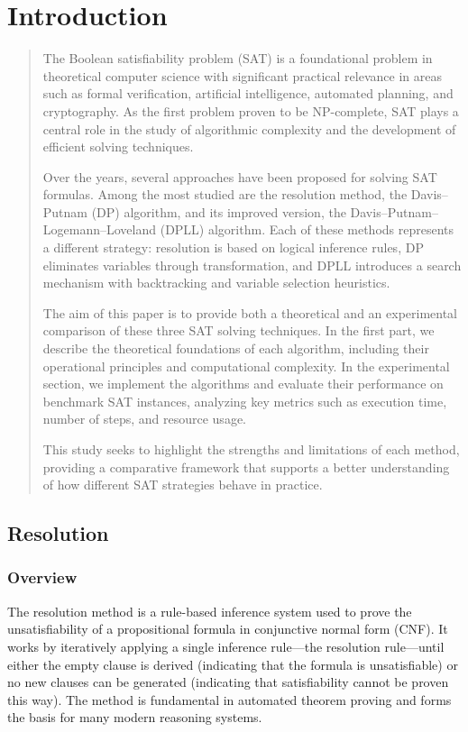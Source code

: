 \documentclass{article}
\begin{document}
\section{Introduction}
\begin{quote}
The Boolean satisfiability problem (SAT) is a foundational problem in theoretical computer science with significant practical relevance in areas such as formal verification, artificial intelligence, automated planning, and cryptography. As the first problem proven to be NP-complete, SAT plays a central role in the study of algorithmic complexity and the development of efficient solving techniques.

Over the years, several approaches have been proposed for solving SAT formulas. Among the most studied are the resolution method, the Davis–Putnam (DP) algorithm, and its improved version, the Davis–Putnam–Logemann–Loveland (DPLL) algorithm. Each of these methods represents a different strategy: resolution is based on logical inference rules, DP eliminates variables through transformation, and DPLL introduces a search mechanism with backtracking and variable selection heuristics.

The aim of this paper is to provide both a theoretical and an experimental comparison of these three SAT solving techniques. In the first part, we describe the theoretical foundations of each algorithm, including their operational principles and computational complexity. In the experimental section, we implement the algorithms and evaluate their performance on benchmark SAT instances, analyzing key metrics such as execution time, number of steps, and resource usage.

This study seeks to highlight the strengths and limitations of each method, providing a comparative framework that supports a better understanding of how different SAT strategies behave in practice.
\end{quote}

\subsection{Resolution}

\subsubsection{Overview}
The resolution method is a rule-based inference system used to prove the unsatisfiability of a propositional formula in conjunctive normal form (CNF). It works by iteratively applying a single inference rule—the resolution rule—until either the empty clause is derived (indicating that the formula is unsatisfiable) or no new clauses can be generated (indicating that satisfiability cannot be proven this way). The method is fundamental in automated theorem proving and forms the basis for many modern reasoning systems.
\end{document}
